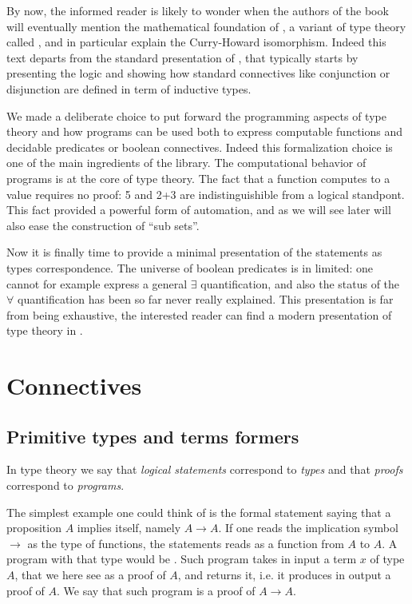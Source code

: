\label{sec:ttch}

By now, the informed reader is likely to wonder when the authors of the book
will eventually mention the mathematical foundation of \Coq{}, a variant of
type theory called \mcbCIC{}, and
in particular explain the Curry-Howard isomorphism.  Indeed this text departs
from the standard presentation of \Coq{}, that typically starts by
presenting the logic and showing how standard connectives like
conjunction or disjunction are defined in term of inductive types.

We made a deliberate choice to put forward the programming aspects of
type theory and how programs can be used both to express computable functions
and decidable predicates or boolean connectives.
Indeed this formalization choice is one of the main ingredients of the \mcbMC{}
library.  The computational behavior of programs is at the core of
type theory.  The fact that a function computes to a value requires no
proof: 5 and 2+3 are indistinguishible from a logical standpont.
This fact provided a powerful form of automation, and as we will
see later will also ease the construction of ``sub sets''.

Now it is finally time to provide a minimal presentation of the statements as types
correspondence.  The universe of boolean predicates is in \mcbMC{} limited: one
cannot for example express a general $\exists$ quantification, and also the
status of the $\forall$ quantification has been so far never really explained.
This presentation is far from being exhaustive, the interested reader can find
a modern presentation of type theory in \cite{hottbook}.

\section{Connectives}

\subsection{Primitive types and terms formers}\label{sec:chi}

In type theory we say that \emph{logical statements} correspond to
\emph{types} and that \emph{proofs} correspond to \emph{programs}.

The simplest example one could think of is the formal statement saying that
a proposition $A$ implies itself, namely $A \rightarrow A$.  If one reads
the implication symbol $\to$ as the type of functions, the statements reads
as a function from $A$ to $A$.  A program with that type would be
.  Such program takes in input a term $x$ of
type $A$, that we here see as a proof of $A$, and returns it, i.e. it
produces in output a proof of $A$.  We say that such program is a
proof of $A \rightarrow A$.

